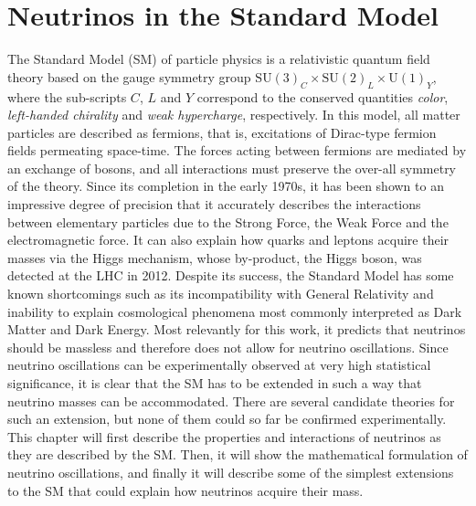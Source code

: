 \setchapterpreamble[u]{\margintoc}
\chapter{Neutrinos in the Standard Model}


The Standard Model (SM) of particle physics is a relativistic quantum field theory based on the gauge symmetry group $\mathrm{SU}(3)_C \times \mathrm{SU}(2)_L \times \mathrm{U}(1)_Y$, where the sub-scripts $C$, $L$ and $Y$ correspond to the conserved quantities \emph{color}, \emph{left-handed chirality} and \emph{weak hypercharge}, respectively. In this model, all matter particles are described as fermions, that is, excitations of Dirac-type fermion fields permeating space-time. The forces acting between fermions are mediated by an exchange of bosons, and all interactions must preserve the over-all symmetry of the theory. Since its completion in the early 1970s, it has been shown to an impressive degree of precision that it accurately describes the interactions between elementary particles due to the Strong Force, the Weak Force and the electromagnetic force. It can also explain how quarks and leptons acquire their masses via the Higgs mechanism, whose by-product, the Higgs boson, was detected at the LHC in 2012. Despite its success, the Standard Model has some known shortcomings such as its incompatibility with General Relativity and inability to explain cosmological phenomena most commonly interpreted as Dark Matter and Dark Energy.  Most relevantly for this work, it predicts that neutrinos should be massless and therefore does not allow for neutrino oscillations. Since neutrino oscillations can be experimentally observed at very high statistical significance, it is clear that the SM has to be extended in such a way that neutrino masses can be accommodated. There are several candidate theories for such an extension, but none of them could so far be confirmed experimentally. This chapter will first describe the properties and interactions of neutrinos as they are described by the SM. Then, it will show the mathematical formulation of neutrino oscillations, and finally it will describe some of the simplest extensions to the SM that could explain how neutrinos acquire their mass.

